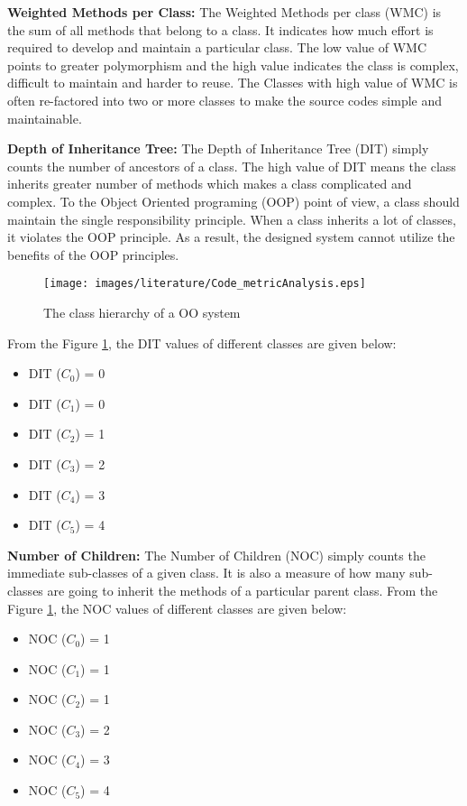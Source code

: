 \documentclass[12pt]{report}
\begin{document}
\textbf{Weighted Methods per Class:}
The Weighted Methods per class (WMC) is the sum of all methods that belong to a class. It indicates how much effort is required to develop and maintain a particular class. The low value of WMC points to greater polymorphism and the high value indicates the class is complex, difficult to maintain and harder to reuse. The Classes with high value of WMC is often re-factored into two or more classes to make the source codes simple and maintainable.

\textbf{Depth of Inheritance Tree:}
The Depth of Inheritance Tree (DIT) simply counts the number of ancestors of a class. The high value of DIT means the class inherits greater number of methods which makes a class complicated and complex. To the Object Oriented programing (OOP) point of view, a class should maintain the single responsibility principle. When a class inherits a lot of classes, it violates the OOP principle. As a result, the designed system cannot utilize the benefits of the OOP principles. 

\begin{figure}[h!]
  \centering
    \texttt{[image: images/literature/Code\_metricAnalysis.eps]}
		\caption{The class hierarchy of a OO system}
		\label{dit_codeMetrics}
\end{figure}
From the Figure \ref{dit_codeMetrics}, the DIT values of different classes are given below:
\begin{itemize}
\item DIT ($C_{0}$) = 0
\item DIT ($C_{1}$) = 0
\item DIT ($C_{2}$) = 1
\item DIT ($C_{3}$) = 2
\item DIT ($C_{4}$) = 3
\item DIT ($C_{5}$) = 4
\end{itemize}

\textbf{Number of Children:}
The Number of Children (NOC) simply counts the immediate sub-classes of a given class. It is also a measure of how many sub-classes are going to inherit the methods of a particular parent class. From the Figure \ref{dit_codeMetrics}, the NOC values of different classes are given below:

\begin{itemize}
\item NOC ($C_{0}$) = 1
\item NOC ($C_{1}$) = 1
\item NOC ($C_{2}$) = 1
\item NOC ($C_{3}$) = 2
\item NOC ($C_{4}$) = 3
\item NOC ($C_{5}$) = 4
\end{itemize}
\end{document}
